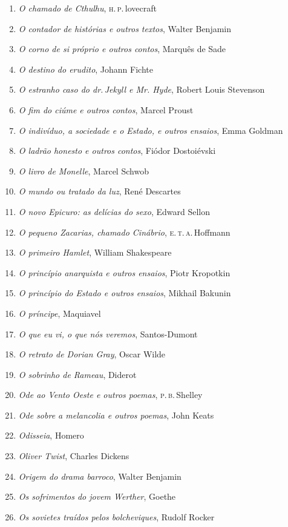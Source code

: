 \begin{enumerate}
\item \textit{O chamado de Cthulhu}, \textsc{h.\,p.}\,lovecraft
\item \textit{O contador de histórias e outros textos}, Walter Benjamin
\item \textit{O corno de si próprio e outros contos}, Marquês de Sade
\item \textit{O destino do erudito}, Johann Fichte
\item \textit{O estranho caso do dr.\,Jekyll e Mr. Hyde}, Robert Louis Stevenson
\item \textit{O fim do ciúme e outros contos}, Marcel Proust
\item \textit{O indivíduo, a sociedade e o Estado, e outros ensaios}, Emma Goldman
\item \textit{O ladrão honesto e outros contos}, Fiódor Dostoiévski
\item \textit{O livro de Monelle}, Marcel Schwob
\item \textit{O mundo ou tratado da luz}, René Descartes
\item \textit{O novo Epicuro: as delícias do sexo}, Edward Sellon
\item \textit{O pequeno Zacarias, chamado Cinábrio}, \textsc{e.\,t.\,a.}\,Hoffmann
\item \textit{O primeiro Hamlet}, William Shakespeare
\item \textit{O princípio anarquista e outros ensaios}, Piotr Kropotkin
\item \textit{O princípio do Estado e outros ensaios}, Mikhail Bakunin
\item \textit{O príncipe}, Maquiavel
\item \textit{O que eu vi, o que nós veremos}, Santos-Dumont
\item \textit{O retrato de Dorian Gray}, Oscar Wilde
\item \textit{O sobrinho de Rameau}, Diderot
\item \textit{Ode ao Vento Oeste e outros poemas}, \textsc{p.\,b.}\,Shelley
\item \textit{Ode sobre a melancolia e outros poemas}, John Keats
\item \textit{Odisseia}, Homero
\item \textit{Oliver Twist}, Charles Dickens
\item \textit{Origem do drama barroco}, Walter Benjamin
\item \textit{Os sofrimentos do jovem Werther}, Goethe
\item \textit{Os sovietes traídos pelos bolcheviques}, Rudolf Rocker

\end{enumerate}
